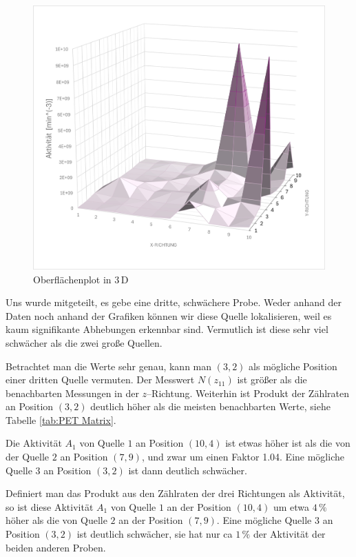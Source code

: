 \documentclass[12pt,a4paper]{scrartcl}
\numberwithin{equation}{section} %
\begin{document}
\begin{figure}[h!]
	\vspace{18pt}
	\begin{minipage}[t]{0.6\textwidth}
		\includegraphics[width=\textwidth]{../media/B3.4/PET_surface.jpg}
		\caption{Oberflächenplot in $3\,\mathrm D$}
		\label{abb:PET surface}
	\end{minipage}
\end{figure}

Uns wurde mitgeteilt, es gebe eine dritte, schwächere Probe. Weder anhand der Daten noch anhand der Grafiken können wir diese Quelle lokalisieren, weil es kaum signifikante Abhebungen erkennbar sind. Vermutlich ist diese sehr viel schwächer als die zwei große Quellen.

Betrachtet man die Werte sehr genau, kann man $(3,2)$ als mögliche Position einer dritten Quelle vermuten. Der Messwert $N(z_{11})$ ist größer als die benachbarten Messungen in der $z$--Richtung. Weiterhin ist Produkt der Zählraten an Position $(3,2)$ deutlich höher als die meisten benachbarten Werte, siehe Tabelle \ref{tab:PET Matrix}.

Die Aktivität $A_1$ von Quelle $1$ an Position $(10,4)$ ist etwas höher ist als die von der Quelle $2$ an Position $(7,9)$, und zwar um einen Faktor 1.04. Eine mögliche Quelle $3$ an Position $(3,2)$ ist dann deutlich schwächer.

Definiert man das Produkt aus den Zählraten der drei Richtungen als Aktivität, so ist diese Aktivität  $A_1$ von Quelle $1$ an der Position $(10,4)$ um etwa $4\,\%$ höher als die von Quelle $2$ an der Position $(7,9)$. Eine mögliche Quelle $3$ an Position $(3,2)$ ist deutlich schwächer, sie hat nur ca $1\,\%$ der Aktivität der beiden anderen Proben.
\end{document}
